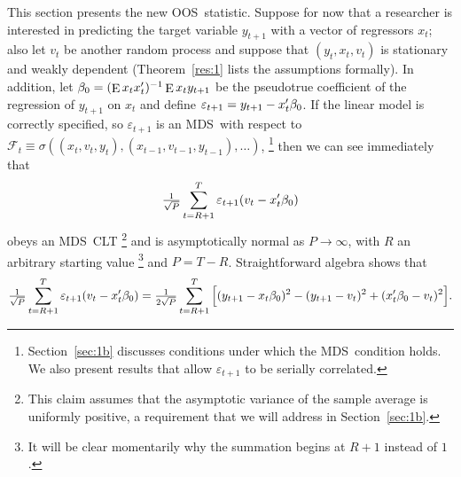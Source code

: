 \documentclass[12pt,fleqn]{article}
\theoremstyle{definition}
\DeclareMathOperator{\E}{E}
\newcommand{\btrue}[1][]{\if#1*\hat\beta_{T+1}\else\beta_0\fi}
\newcommand{\osum}[1]{\sum_{#1=R+1}^T}
\newcommand{\oclt}[1]{\tfrac{1}{\sqrt{P}} \osum{#1}}
\newcommand{\clt}{CLT}
\newcommand{\mds}{MDS}
\newcommand{\oos}{OOS}
\begin{document}
This section presents the new \oos\ statistic.
Suppose for now that a researcher is interested in
predicting the target variable $y_{t+1}$ with a vector of regressors
$x_t$; also let $v_t$ be another random process and suppose that
$(y_t, x_t, v_t)$ is stationary and weakly dependent
(Theorem~\ref{res:1} lists the assumptions formally).  In addition,
let $\btrue = (\E x_t x_t')^{-1} \E x_t y_{t+1}$ be the pseudotrue
coefficient of the regression of $y_{t+1}$ on $x_t$ and define
$\varepsilon_{t+1} = y_{t+1} - x_t'\btrue$.  If the linear model is
correctly specified, so $\varepsilon_{t+1}$ is an \mds\ with respect to
$\mathcal{F}_t \equiv \sigma((x_t, v_t, y_t), (x_{t-1}, v_{t-1},
y_{t-1}),\dots)$,%
\footnote{Section~\ref{sec:1b} discusses conditions under which the
  \mds\ condition holds. We also present results that allow
  $\varepsilon_{t+1}$ to be serially correlated.} %
then we can see immediately that
\begin{equation}
  \label{eq:4}
  \oclt{t} \varepsilon_{t+1} (v_t - x_t'\btrue)
\end{equation}
obeys an \mds\ \clt%
\footnote{This claim assumes that the asymptotic variance of the
  sample average is uniformly positive, a requirement that we will
  address in Section~\ref{sec:1b}.} %
and is asymptotically normal as $P \to \infty$, with $R$ an
arbitrary starting value%
\footnote{It will be clear momentarily why the
  summation begins at $R+1$ instead of $1$.} %
and $P = T - R$.
Straightforward algebra \citep{ClW:07} shows that
\begin{equation}
  \label{eq:5}
  \tfrac{1}{\sqrt{P}} \osum{t} \varepsilon_{t+1} (v_t -
  x_t'\btrue) = \tfrac{1}{2 \sqrt{P}} \osum{t} \Big[(y_{t+1} -
  x_t\btrue)^2 - (y_{t+1} - v_t)^2 + (x_t'\btrue - v_t)^2 \Big].
\end{equation}
\end{document}
